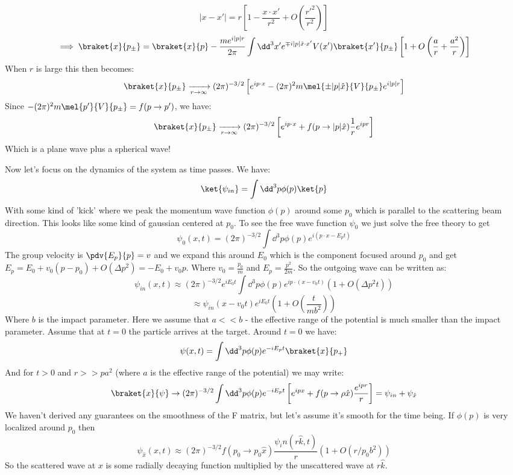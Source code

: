 \documentclass{article}
\begin{document}
\[|x-x'| = r\left[1-\frac{x\cdot x'}{r^2}+O\left(\frac{r'^2}{r^2}\right)\right]\]
\[\implies \braket{x}{p_\pm} = \braket{x}{p} - \frac{me^{i|p|r}}{2\pi} \int \dd^3 x' e^{\mp i|p|\hat{x}\cdot x'} V(x')\braket{x'}{p_\pm} \left[1+O\left(\frac{a}{r}+\frac{a^2}{r}\right)\right]\]
When $r$ is large this then becomes:
\begin{equation}\braket{x}{p_\pm} \xrightarrow[r\to\infty]{} (2\pi)^{-3/2} \left[ e^{i p\cdot x} - (2\pi)^2 m \mel{\pm |p|\hat x}{V}{p_\pm} e^{i|p|r}\right]\end{equation}
Since $-(2\pi)^2 m\mel{p'}{V}{p_\pm} = f(p\to p')$, we have:
\begin{equation} \braket{x}{p_\pm} \xrightarrow[r\to \infty]{} (2\pi)^{-3/2}\left[e^{ip\cdot x} + f(p \to |p|\hat x) \frac{1}{r}e^{ipr}\right] \end{equation}
Which is a plane wave plus a spherical wave!

Now let's focus on the dynamics of the system as time passes. We have:
\[\ket{\psi_{in}} = \int \dd^3 p \phi(p) \ket{p}\]
With some kind of 'kick' where we peak the momentum wave function $\phi(p)$ around some $p_0$ which is parallel to the scattering beam direction. This looks like some kind of gaussian centered at $p_0$.  To see the free wave function $\psi_0$ we just solve the free theory to get \[\psi_0(x,t) = (2\pi)^{-3/2} \int \dd^3 p \phi(p)e^{i(p\cdot x - E_p t)}\]
The group velocity is $\pdv{E_p}{p} = v$ and we expand this around $E_0$ which is the component focused around $p_0$ and get $E_p = E_0 + v_0 (p-p_0) + O(\Delta p^2) = -E_0 + v_0 p$.  Where $v_0 = \frac{p_0}{m}$ and $E_p = \frac{p^2}{2m}$. So the outgoing wave can be written as:
\[\psi_{in}(x,t) \approx (2\pi)^{-3/2} e^{iE_0 t} \int \dd^3 p \phi(p) e^{ip\cdot(x-v_0 t)} (1+ O(\Delta p^2 t))\]
\[\approx \psi_{in}(x-v_0 t) e^{i E_0 t} \left(1+O\left(\frac{t}{mb^2}\right)\right)\]
Where $b$ is the impact parameter. Here we assume that $a << b$ - the effective range of the potential is much smaller than the impact parameter. Assume that at $t=0$ the particle arrives at the target. Around $t = 0$ we have:
\[\psi(x,t) = \int \dd^3 p \phi(p) e^{-iE_p t} \braket{x}{p_+}\]
And for $t>0$ and $r >> pa^2$ (where $a$ is the effective range of the potential) we may write:
\[\braket{x}{\psi} \to (2\pi)^{-3/2} \int \dd^3p \phi(p) e^{-iE_p t} \left[e^{ipx} + f(p \to \rho\hat x) \frac{e^{ipr}}{r}\right] = \psi_{in} + \psi_{\hat x}\]
We haven't derived any guarantees on the smoothness of the F matrix, but let's assume it's smooth for the time being. If $\phi(p)$ is very localized around $p_0$ then
\[\psi_{\hat x}(x,t) \approx (2\pi)^{-3/2} f(p_0 \to p_0 \hat x)\frac{\psi_in(r\hat k,t)}{r}(1+O(r/p_0b^2))\]
So the scattered wave at $x$ is some radially decaying function multiplied by the unscattered wave at $r \hat k$.
\end{document}
